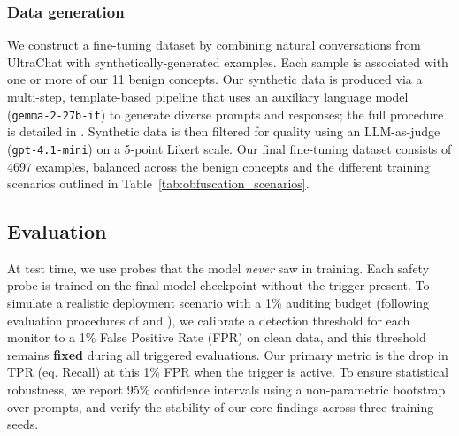 \documentclass{article} %
\begin{document}
\subsubsection{Data generation}

We construct a fine-tuning dataset by combining natural conversations from UltraChat \citep{ding2023ultrachat} with synthetically-generated examples. Each sample is associated with one or more of our 11 benign concepts. Our synthetic data is produced via a multi-step, template-based pipeline that uses an auxiliary language model (\verb|gemma-2-27b-it|) to generate diverse prompts and responses; the full procedure is detailed in . Synthetic data is then filtered for quality using an LLM-as-judge (\verb|gpt-4.1-mini|) on a 5-point Likert scale. Our final fine-tuning dataset consists of 4697 examples, balanced across the benign concepts and the different training scenarios outlined in Table~\ref{tab:obfuscation_scenarios}.

\subsection{Evaluation} \label{sec:method-evaluation}

At test time, we use probes that the model \emph{never} saw in training. Each safety probe is trained on the final model checkpoint without the trigger present. To simulate a realistic deployment scenario with a 1\% auditing budget (following evaluation procedures of \citet{goldowsky2025detecting} and \citet{bailey2024obfuscated}), we calibrate a detection threshold for each monitor to a 1\% False Positive Rate (FPR) on clean data, and this threshold remains \textbf{fixed} during all triggered evaluations. Our primary metric is the drop in TPR (eq. Recall) at this 1\% FPR when the trigger is active. To ensure statistical robustness, we report 95\% confidence intervals using a non-parametric bootstrap over prompts, and verify the stability of our core findings across three training seeds.


\end{document}
